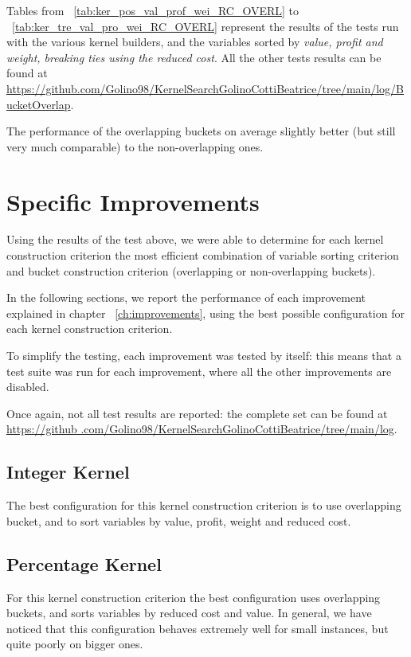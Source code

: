 Tables from ~\ref{tab:ker_pos_val_prof_wei_RC_OVERL} to ~\ref{tab:ker_tre_val_pro_wei_RC_OVERL}
represent the results of the tests run with the various kernel builders,
and the variables sorted by \textit{value, profit and weight, breaking ties using the reduced cost}.
All the other tests results can be found at
\url{https://github.com/Golino98/KernelSearchGolinoCottiBeatrice/tree/main/log/BucketOverlap}.

The performance of the overlapping buckets on average slightly better (but still very much comparable)
to the non-overlapping ones.







\section{Specific Improvements}
Using the results of the test above, we were able to determine
for each kernel construction criterion the most efficient
combination of variable sorting criterion and bucket
construction criterion (overlapping or non-overlapping buckets).

In the following sections, we report the performance
of each improvement explained in chapter ~\ref{ch:improvements},
using the best possible configuration for each kernel construction criterion.

To simplify the testing, each improvement was tested by itself: this means that a test suite was run for each
improvement, where all the other improvements are disabled.

Once again, not all test results are reported: the complete set can be found at \url{https://github
.com/Golino98/KernelSearchGolinoCottiBeatrice/tree/main/log}.

\subsection{Integer Kernel}
The best configuration for this kernel construction criterion is to use overlapping bucket,
and to sort variables by value, profit, weight and reduced cost.

\subsection{Percentage Kernel}
For this kernel construction criterion the best configuration uses overlapping buckets,
and sorts variables by reduced cost and value.
In general, we have noticed that this configuration behaves extremely well for small instances, but quite poorly on
bigger ones.

